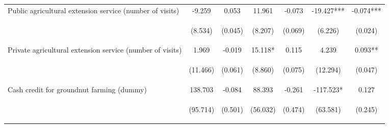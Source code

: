 \begin{center}
\begin{tabular}{lcccccc}
Public agricultural extension service (number of visits) & -9.259 & 0.053 & 11.961 & -0.073 & -19.427*** & -0.074*** \\
\vspace{4pt} & \begin{footnotesize}(8.534)\end{footnotesize} & \begin{footnotesize}(0.045)\end{footnotesize} & \begin{footnotesize}(8.207)\end{footnotesize} & \begin{footnotesize}(0.069)\end{footnotesize} & \begin{footnotesize}(6.226)\end{footnotesize} & \begin{footnotesize}(0.024)\end{footnotesize} \\
Private agricultural extension service (number of visits) & 1.969 & -0.019 & 15.118* & 0.115 & 4.239 & 0.093** \\
\vspace{4pt} & \begin{footnotesize}(11.466)\end{footnotesize} & \begin{footnotesize}(0.061)\end{footnotesize} & \begin{footnotesize}(8.860)\end{footnotesize} & \begin{footnotesize}(0.075)\end{footnotesize} & \begin{footnotesize}(12.294)\end{footnotesize} & \begin{footnotesize}(0.047)\end{footnotesize} \\
Cash credit for groundnut farming (dummy) & 138.703 & -0.084 & 88.393 & -0.261 & -117.523* & 0.127 \\
\vspace{4pt} & \begin{footnotesize}(95.714)\end{footnotesize} & \begin{footnotesize}(0.501)\end{footnotesize} & \begin{footnotesize}(56.032)\end{footnotesize} & \begin{footnotesize}(0.474)\end{footnotesize} & \begin{footnotesize}(63.581)\end{footnotesize} & \begin{footnotesize}(0.245)\end{footnotesize} \\

\end{tabular}
\end{center}

